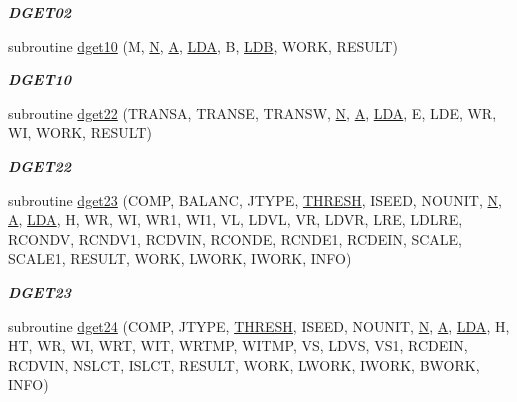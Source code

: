 \begin{DoxyCompactItemize}
\begin{DoxyCompactList}\small\item\em {\bfseries D\+G\+E\+T02} \end{DoxyCompactList}\item 
subroutine \hyperlink{group__double__eig_gafb713f19d6762f47a227399fcfdf6f2a}{dget10} (M, \hyperlink{polmisc_8c_a0240ac851181b84ac374872dc5434ee4}{N}, \hyperlink{classA}{A}, \hyperlink{example__user_8c_ae946da542ce0db94dced19b2ecefd1aa}{L\+D\+A}, B, \hyperlink{example__user_8c_a50e90a7104df172b5a89a06c47fcca04}{L\+D\+B}, W\+O\+R\+K, R\+E\+S\+U\+L\+T)
\begin{DoxyCompactList}\small\item\em {\bfseries D\+G\+E\+T10} \end{DoxyCompactList}\item 
subroutine \hyperlink{group__double__eig_ga585a3526e86563a9452e9243c23ad31b}{dget22} (T\+R\+A\+N\+S\+A, T\+R\+A\+N\+S\+E, T\+R\+A\+N\+S\+W, \hyperlink{polmisc_8c_a0240ac851181b84ac374872dc5434ee4}{N}, \hyperlink{classA}{A}, \hyperlink{example__user_8c_ae946da542ce0db94dced19b2ecefd1aa}{L\+D\+A}, E, L\+D\+E, W\+R, W\+I, W\+O\+R\+K, R\+E\+S\+U\+L\+T)
\begin{DoxyCompactList}\small\item\em {\bfseries D\+G\+E\+T22} \end{DoxyCompactList}\item 
subroutine \hyperlink{group__double__eig_gaa52ccc18dfdd08a5c0af32a0bb689f6c}{dget23} (C\+O\+M\+P, B\+A\+L\+A\+N\+C, J\+T\+Y\+P\+E, \hyperlink{zlaqgs_8c_a0656018abfc9fa2821827415f5d5ea57}{T\+H\+R\+E\+S\+H}, I\+S\+E\+E\+D, N\+O\+U\+N\+I\+T, \hyperlink{polmisc_8c_a0240ac851181b84ac374872dc5434ee4}{N}, \hyperlink{classA}{A}, \hyperlink{example__user_8c_ae946da542ce0db94dced19b2ecefd1aa}{L\+D\+A}, H, W\+R, W\+I, W\+R1, W\+I1, V\+L, L\+D\+V\+L, V\+R, L\+D\+V\+R, L\+R\+E, L\+D\+L\+R\+E, R\+C\+O\+N\+D\+V, R\+C\+N\+D\+V1, R\+C\+D\+V\+I\+N, R\+C\+O\+N\+D\+E, R\+C\+N\+D\+E1, R\+C\+D\+E\+I\+N, S\+C\+A\+L\+E, S\+C\+A\+L\+E1, R\+E\+S\+U\+L\+T, W\+O\+R\+K, L\+W\+O\+R\+K, I\+W\+O\+R\+K, I\+N\+F\+O)
\begin{DoxyCompactList}\small\item\em {\bfseries D\+G\+E\+T23} \end{DoxyCompactList}\item 
subroutine \hyperlink{group__double__eig_ga656556219b63123ac0f9abe66299ec50}{dget24} (C\+O\+M\+P, J\+T\+Y\+P\+E, \hyperlink{zlaqgs_8c_a0656018abfc9fa2821827415f5d5ea57}{T\+H\+R\+E\+S\+H}, I\+S\+E\+E\+D, N\+O\+U\+N\+I\+T, \hyperlink{polmisc_8c_a0240ac851181b84ac374872dc5434ee4}{N}, \hyperlink{classA}{A}, \hyperlink{example__user_8c_ae946da542ce0db94dced19b2ecefd1aa}{L\+D\+A}, H, H\+T, W\+R, W\+I, W\+R\+T, W\+I\+T, W\+R\+T\+M\+P, W\+I\+T\+M\+P, V\+S, L\+D\+V\+S, V\+S1, R\+C\+D\+E\+I\+N, R\+C\+D\+V\+I\+N, N\+S\+L\+C\+T, I\+S\+L\+C\+T, R\+E\+S\+U\+L\+T, W\+O\+R\+K, L\+W\+O\+R\+K, I\+W\+O\+R\+K, B\+W\+O\+R\+K, I\+N\+F\+O)

\end{DoxyCompactItemize}
